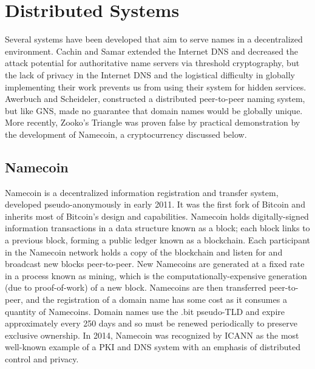 \section{Distributed Systems}

Several systems have been developed that aim to serve names in a decentralized environment. Cachin and Samar\cite{cachin2004secure} extended the Internet DNS and decreased the attack potential for authoritative name servers via threshold cryptography, but the lack of privacy in the Internet DNS and the logistical difficulty in globally implementing their work prevents us from using their system for hidden services. Awerbuch and Scheideler,\cite{awerbuch2004group} constructed a distributed peer-to-peer naming system, but like GNS, made no guarantee that domain names would be globally unique. More recently, Zooko's Triangle was proven false by practical demonstration by the development of Namecoin, a cryptocurrency discussed below.

\subsection{Namecoin}
\label{sec:Namecoin}

Namecoin is a decentralized information registration and transfer system, developed pseudo-anonymously in early 2011. It was the first fork of Bitcoin\cite{nakamoto2008bitcoin} and inherits most of Bitcoin's design and capabilities. Namecoin holds digitally-signed information transactions in a data structure known as a block; each block links to a previous block, forming a public ledger known as a blockchain. Each participant in the Namecoin network holds a copy of the blockchain and listen for and broadcast new blocks peer-to-peer. New Namecoins are generated at a fixed rate in a process known as mining, which is the computationally-expensive generation (due to proof-of-work) of a new block. Namecoins are then transferred peer-to-peer, and the registration of a domain name has some cost as it consumes a quantity of Namecoins. Domain names use the .bit pseudo-TLD and expire approximately every 250 days and so must be renewed periodically to preserve exclusive ownership. In 2014, Namecoin was recognized by ICANN as the most well-known example of a PKI and DNS system with an emphasis of distributed control and privacy.\cite{NamecoinReportICANN}

